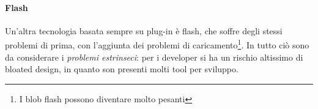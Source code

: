 \paragraph*{Flash} Un'altra tecnologia basata sempre su plug-in \`e flash, che soffre degli stessi problemi di prima, con l'aggiunta dei problemi di caricamento\footnote{I blob flash possono diventare molto pesanti}. In tutto ci\`o sono da considerare i \textit{problemi estrinseci}: per i developer si ha un rischio altissimo di bloated design, in quanto son presenti molti tool per sviluppo.
